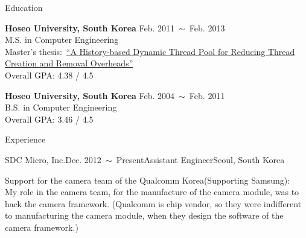 \documentclass{resume} %
\begin{document}


\begin{rSection}{Education}

{\bf Hoseo University, South Korea} \hfill Feb. 2011~$\sim$~Feb. 2013 \\
M.S. in Computer Engineering \\
Master's thesis:~\href{http://dlibrary.hoseo.ac.kr/search/searchDetail.do?rec_key=SH1_000000950591}
{\footnotesize ``A History-based Dynamic Thread Pool for Reducing Thread Creation and Removal Overheads''} \\
Overall GPA: 4.38 / 4.5

{\bf Hoseo University, South Korea} \hfill Feb. 2004~$\sim$~Feb. 2011 \\
B.S. in Computer Engineering \\
Overall GPA: 3.46 / 4.5

\end{rSection}



\begin{rSection}{Experience}



  \begin{rSubsection}{SDC Micro, Inc.}{Dec. 2012~$\sim$~Present}{Assistant Engineer}{Seoul, South Korea}
  \item Support for the camera team of the Qualcomm Korea(Supporting Samsung): \\
    \small{
      My role in the camera team, for the manufacture of the camera module, was to hack the camera framework.
      \footnotesize{
        (Qualcomm is chip vendor, so they were indifferent to manufacturing the camera module,
        when they design the software of the camera framework.)}}
  \end{rSubsection}

\end{rSection}
\vspace{-2mm}
\end{document}

